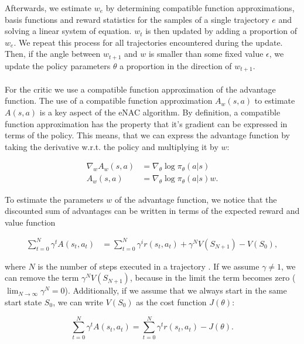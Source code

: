 Afterwards, we estimate $w_e$ by determining compatible function approximations, basis functions and reward statistics for the samples of a single trajectory $e$ and solving a linear system of equation. $w_t$ is then updated by adding a proportion of $w_e$. We repeat this process for all trajectories encountered during the update. Then, if the angle between $w_{t+1}$ and $w$ is smaller than some fixed value $\epsilon$, we update the policy parameters $\theta$ a proportion in the direction of $w_{t+1}$.
\\\\
 For the critic we use a compatible function approximation of the advantage function. The use of a compatible function approximation $A_w(s, a)$ to estimate $A(s, a)$ \citep{sutton2000policy} is a key aspect of the eNAC algorithm. By definition, a compatible function approximation has the property that it's gradient can be expressed in terms of the policy. This means, that we can express the advantage function by taking the derivative w.r.t. the policy and multiplying it by $w$:

\begin{align}
\nabla_w A_w(s,a) &= \nabla_{\theta} \log \pi_{\theta}(a|s)\label{eq:adv1}\\
A_w(s,a) &= \nabla_{\theta} \log \pi_{\theta}(a|s)w. \label{eq:adv2}
\end{align}

\noindent To estimate the parameters $w$ of the advantage function, we notice that the discounted sum of advantages can be written in terms of the expected reward and value function

\begin{align}
\sum_{t = 0}^{N}\gamma^t A(s_t, a_t) &= \sum_{t = 0}^{N}\gamma^i r(s_t, a_t) + \gamma^N V(S_{N+1}) - V(S_0),
\end{align}

\noindent where $N$ is the number of steps executed in a trajectory \citep{peters2005natural}. If we assume $\gamma \neq 1$, we can remove the term $\gamma^N V(S_{N+1})$, because in the limit the term becomes zero ($\lim_{N \rightarrow \infty}\gamma^N = 0$). Additionally, if we assume that we always start in the same start state $S_0$, we can write $V(S_0)$ as the cost function $J(\theta)$:

\begin{equation}
	\sum_{t = 0}^{N}\gamma^t A(s_t, a_t) = \sum_{t = 0}^{N}\gamma^t r(s_t, a_t) - J(\theta).
\end{equation}

